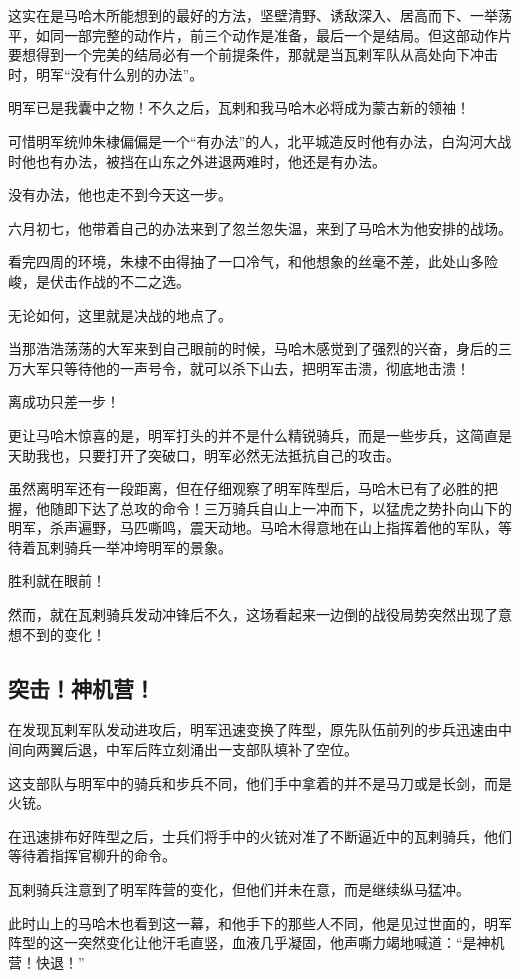 \begin{multicols}{\theparacolNo}
这实在是马哈木所能想到的最好的方法，坚壁清野、诱敌深入、居高而下、一举荡平，如同一部完整的动作片，前三个动作是准备，最后一个是结局。但这部动作片要想得到一个完美的结局必有一个前提条件，那就是当瓦剌军队从高处向下冲击时，明军“没有什么别的办法”。

明军已是我囊中之物！不久之后，瓦剌和我马哈木必将成为蒙古新的领袖！

可惜明军统帅朱棣偏偏是一个“有办法”的人，北平城造反时他有办法，白沟河大战时他也有办法，被挡在山东之外进退两难时，他还是有办法。

没有办法，他也走不到今天这一步。

六月初七，他带着自己的办法来到了忽兰忽失温，来到了马哈木为他安排的战场。

看完四周的环境，朱棣不由得抽了一口冷气，和他想象的丝毫不差，此处山多险峻，是伏击作战的不二之选。

无论如何，这里就是决战的地点了。

当那浩浩荡荡的大军来到自己眼前的时候，马哈木感觉到了强烈的兴奋，身后的三万大军只等待他的一声号令，就可以杀下山去，把明军击溃，彻底地击溃！

离成功只差一步！

更让马哈木惊喜的是，明军打头的并不是什么精锐骑兵，而是一些步兵，这简直是天助我也，只要打开了突破口，明军必然无法抵抗自己的攻击。

虽然离明军还有一段距离，但在仔细观察了明军阵型后，马哈木已有了必胜的把握，他随即下达了总攻的命令！三万骑兵自山上一冲而下，以猛虎之势扑向山下的明军，杀声遍野，马匹嘶鸣，震天动地。马哈木得意地在山上指挥着他的军队，等待着瓦剌骑兵一举冲垮明军的景象。

胜利就在眼前！

然而，就在瓦剌骑兵发动冲锋后不久，这场看起来一边倒的战役局势突然出现了意想不到的变化！

\subsection{突击！神机营！}
在发现瓦剌军队发动进攻后，明军迅速变换了阵型，原先队伍前列的步兵迅速由中间向两翼后退，中军后阵立刻涌出一支部队填补了空位。

这支部队与明军中的骑兵和步兵不同，他们手中拿着的并不是马刀或是长剑，而是火铳。

在迅速排布好阵型之后，士兵们将手中的火铳对准了不断逼近中的瓦剌骑兵，他们等待着指挥官柳升的命令。

瓦剌骑兵注意到了明军阵营的变化，但他们并未在意，而是继续纵马猛冲。

此时山上的马哈木也看到这一幕，和他手下的那些人不同，他是见过世面的，明军阵型的这一突然变化让他汗毛直竖，血液几乎凝固，他声嘶力竭地喊道：“是神机营！快退！”


\end{multicols}
